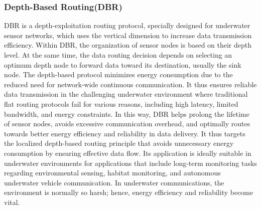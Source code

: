 \documentclass[]{nsm-thesis}
\begin{document}
\subsubsection{Depth-Based Routing(DBR)}
DBR is a depth-exploitation routing protocol, specially designed for underwater sensor networks, which uses the vertical dimension to increase data transmission efficiency. Within DBR, the organization of sensor nodes is based on their depth level. At the same time, the data routing decision depends on selecting an optimum depth node to forward data toward its destination, usually the sink node. The depth-based protocol minimizes energy consumption due to the reduced need for network-wide continuous communication. It thus ensures reliable data transmission in the challenging underwater environment where traditional flat routing protocols fail for various reasons, including high latency, limited bandwidth, and energy constraints. In this way, DBR helps prolong the lifetime of sensor nodes, avoids excessive communication overhead, and optimally routes towards better energy efficiency and reliability in data delivery. It thus targets the localized depth-based routing principle that avoids unnecessary energy consumption by ensuring effective data flow. Its application is ideally suitable in underwater environments for applications that include long-term monitoring tasks regarding environmental sensing, habitat monitoring, and autonomous underwater vehicle communication. In underwater communications, the environment is normally so harsh; hence, energy efficiency and reliability become vital.\cite{10.1007/978-3-540-79549-0_7}
\end{document}
